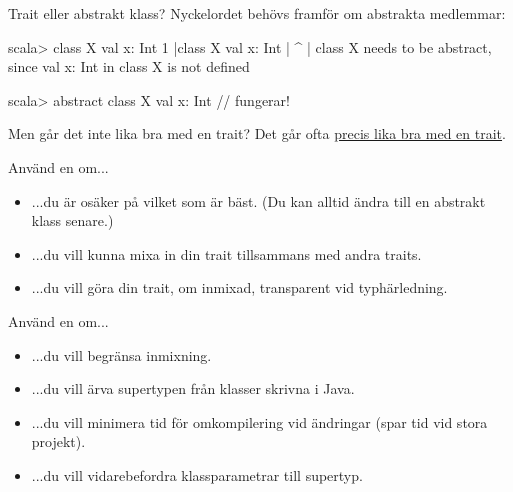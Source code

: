 
\begin{Slide}{Trait eller abstrakt klass?}\SlideFontSmall
Nyckelordet  behövs framför  om abstrakta medlemmar:
\begin{REPLsmall}
scala> class X { val x: Int }
1 |class X { val x: Int }
  |      ^
  |      class X needs to be abstract, since val x: Int in class X is not defined 

scala> abstract class X { val x: Int }  // fungerar!
\end{REPLsmall}  
Men går det inte lika bra med en trait? \pause Det går ofta \href{https://youtu.be/aFmIS5qeetA?t=221}{precis lika bra med en trait}.%
\label{slideW07:traitorclass}%
\begin{multicols}{2}
\noindent Använd en  om...
\begin{itemize}
\item ...du är osäker på vilket som är bäst. (Du kan alltid ändra till en abstrakt klass senare.)
\item ...du vill kunna mixa in din trait tillsammans med andra traits.
\item ...du vill göra din trait, om inmixad, transparent vid typhärledning.

\end{itemize}

\columnbreak

\noindent Använd en  om...
\begin{itemize}
\item ...du vill begränsa inmixning. 
\item ...du vill ärva supertypen från klasser skrivna i Java.
\item ...du vill minimera tid för omkompilering vid ändringar (spar tid vid stora projekt).
\item ...du vill vidarebefordra klassparametrar till supertyp.
\end{itemize}
\end{multicols}
\end{Slide}

